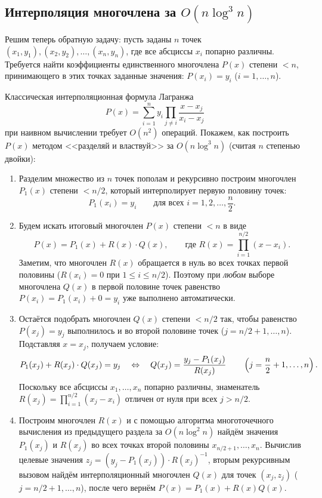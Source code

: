 \subsection{Интерполяция многочлена за \texorpdfstring{$O(n \log^3 n)$}{O(n log\^3 n)}}

Решим теперь обратную задачу: пусть заданы $n$ точек $(x_1, y_1), (x_2, y_2), \dots, (x_n, y_n)$, где все абсциссы $x_i$ попарно различны. Требуется найти коэффициенты единственного многочлена $P(x)$ степени $< n$, принимающего в этих точках заданные значения: $P(x_i) = y_i$ ($i = 1, \dots, n$).

Классическая интерполяционная формула Лагранжа
\[
    P(x) = \sum_{i=1}^n y_i \prod_{j \ne i} \frac{x - x_j}{x_i - x_j}
\]
при наивном вычислении требует $O(n^2)$ операций. Покажем, как построить $P(x)$ методом <<разделяй и властвуй>> за $O(n \log^3 n)$ (считая $n$ степенью двойки):

\begin{enumerate}
    \item Разделим множество из $n$ точек пополам и рекурсивно построим многочлен $P_1(x)$ степени $< n / 2$, который интерполирует первую половину точек:
    \[
        P_1(x_i) = y_i \qquad \text{для всех } i = 1, 2, \dots, \frac{n}{2}.
    \]
    \item Будем искать итоговый многочлен $P(x)$ степени $< n$ в виде
    \[
        P(x) = P_1(x) + R(x) \cdot Q(x), \qquad \text{где } R(x) = \prod_{i=1}^{n/2} (x - x_i).
    \]
    Заметим, что многочлен $R(x)$ обращается в нуль во всех точках первой половины ($R(x_i) = 0$ при $1 \le i \le n/2$). Поэтому при \emph{любом} выборе многочлена $Q(x)$ в первой половине точек равенство $P(x_i) = P_1(x_i) + 0 = y_i$ уже выполнено автоматически.

    \item Остаётся подобрать многочлен $Q(x)$ степени $< n / 2$ так, чтобы равенство $P(x_j) = y_j$ выполнилось и во второй половине точек ($j = n/2 + 1, \dots, n$). Подставляя $x = x_j$, получаем условие:
    \[
        P_1(x_j) + R(x_j) \cdot Q(x_j) = y_j \quad \Leftrightarrow \quad Q(x_j) = \frac{y_j - P_1(x_j)}{R(x_j)} \qquad \left(j = \frac{n}{2} + 1, \dots, n\right).
    \]
    Поскольку все абсциссы $x_1, \dots, x_n$ попарно различны, знаменатель $R(x_j) = \prod_{i=1}^{n/2} (x_j - x_i)$ отличен от нуля при всех $j > n / 2$.

    \item Построим многочлен $R(x)$ и с помощью алгоритма многоточечного вычисления из предыдущего раздела за $O(n \log^2 n)$ найдём значения $P_1(x_j)$ и $R(x_j)$ во всех точках второй половины $x_{n/2+1}, \dots, x_n$. Вычислив целевые значения $z_j = (y_j - P_1(x_j)) \cdot R(x_j)^{-1}$, вторым рекурсивным вызовом найдём интерполяционный многочлен $Q(x)$ для точек $(x_j, z_j)$ ($j = n/2 + 1, \dots, n$), после чего вернём $P(x) = P_1(x) + R(x) Q(x)$.
\end{enumerate}

